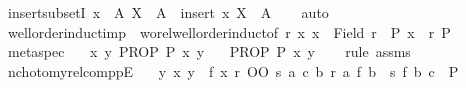 \begin{isabellebody}
%
\endisatagproof
{\isafoldproof}%
%
\isadelimproof
\isanewline
%
\endisadelimproof
\isanewline
{}\isamarkupfalse%
\ insert{\isacharunderscore}{\kern0pt}subsetI{\isacharcolon}{\kern0pt}\ {\isachardoublequoteopen}{\isasymlbrakk}x\ {\isasymin}\ A{\isacharsemicolon}{\kern0pt}\ X\ {\isasymsubseteq}\ A{\isasymrbrakk}\ {\isasymLongrightarrow}\ insert\ x\ X\ {\isasymsubseteq}\ A{\isachardoublequoteclose}\isanewline
%
\isadelimproof
\ \ %
\endisadelimproof
%
\isatagproof
{}\isamarkupfalse%
\ auto%
\endisatagproof
{\isafoldproof}%
%
\isadelimproof
\isanewline
%
\endisadelimproof
\isanewline
{}\isamarkupfalse%
\ well{\isacharunderscore}{\kern0pt}order{\isacharunderscore}{\kern0pt}induct{\isacharunderscore}{\kern0pt}imp\ {\isacharequal}{\kern0pt}\ wo{\isacharunderscore}{\kern0pt}rel{\isachardot}{\kern0pt}well{\isacharunderscore}{\kern0pt}order{\isacharunderscore}{\kern0pt}induct{\isacharbrackleft}{\kern0pt}of\ r\ {\isachardoublequoteopen}{\isasymlambda}x{\isachardot}{\kern0pt}\ x\ {\isasymin}\ Field\ r\ {\isasymlongrightarrow}\ P\ x{\isachardoublequoteclose}\ \ r\ P{\isacharbrackright}{\kern0pt}\isanewline
\isanewline
{}\isamarkupfalse%
\ meta{\isacharunderscore}{\kern0pt}spec{}{\isacharcolon}{\kern0pt}\isanewline
\ \ \ {\isachardoublequoteopen}{\isacharparenleft}{\kern0pt}{\isasymAnd}x\ y{\isachardot}{\kern0pt}\ PROP\ P\ x\ y{\isacharparenright}{\kern0pt}{\isachardoublequoteclose}\isanewline
\ \ \ {\isachardoublequoteopen}PROP\ P\ x\ y{\isachardoublequoteclose}\isanewline
%
\isadelimproof
\ \ %
\endisadelimproof
%
\isatagproof
{}\isamarkupfalse%
\ {\isacharparenleft}{\kern0pt}rule\ assms{\isacharparenright}{\kern0pt}%
\endisatagproof
{\isafoldproof}%
%
\isadelimproof
\isanewline
%
\endisadelimproof
\isanewline
{}\isamarkupfalse%
\ nchotomy{\isacharunderscore}{\kern0pt}relcomppE{\isacharcolon}{\kern0pt}\isanewline
\ \ \ {\isachardoublequoteopen}{\isasymAnd}y{\isachardot}{\kern0pt}\ {\isasymexists}x{\isachardot}{\kern0pt}\ y\ {\isacharequal}{\kern0pt}\ f\ x{\isachardoublequoteclose}\ {\isachardoublequoteopen}{\isacharparenleft}{\kern0pt}r\ OO\ s{\isacharparenright}{\kern0pt}\ a\ c{\isachardoublequoteclose}\ {\isachardoublequoteopen}{\isasymAnd}b{\isachardot}{\kern0pt}\ r\ a\ {\isacharparenleft}{\kern0pt}f\ b{\isacharparenright}{\kern0pt}\ {\isasymLongrightarrow}\ s\ {\isacharparenleft}{\kern0pt}f\ b{\isacharparenright}{\kern0pt}\ c\ {\isasymLongrightarrow}\ P{\isachardoublequoteclose}\isanewline

\end{isabellebody}
